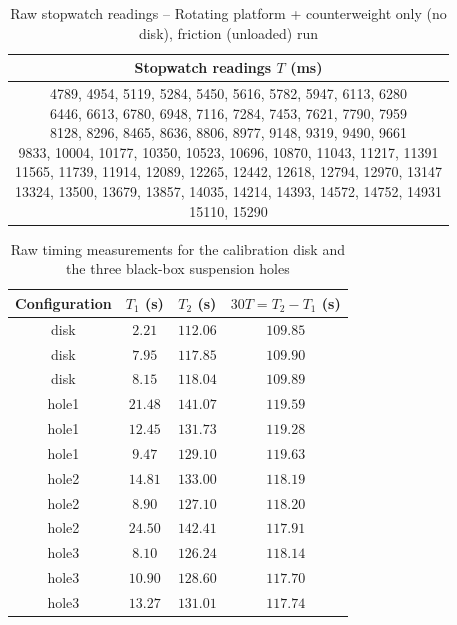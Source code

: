 \begin{table}[htb!]
\centering
\caption{Raw stopwatch readings -- Rotating platform + counterweight only (no disk), friction (unloaded) run}
\begin{tabular}{c}
\toprule
Stopwatch readings $T$ (\unit{\ms}) \\
\midrule
\makecell{4789, 4954, 5119, 5284, 5450, 5616, 5782, 5947, 6113, 6280 \\ 6446, 6613, 6780, 6948, 7116, 7284, 7453, 7621, 7790, 7959 \\ 8128, 8296, 8465, 8636, 8806, 8977, 9148, 9319, 9490, 9661 \\ 9833, 10004, 10177, 10350, 10523, 10696, 10870, 11043, 11217, 11391 \\ 11565, 11739, 11914, 12089, 12265, 12442, 12618, 12794, 12970, 13147 \\ 13324, 13500, 13679, 13857, 14035, 14214, 14393, 14572, 14752, 14931 \\ 15110, 15290} \\
\bottomrule
\end{tabular}
\end{table}
\begin{table}[htb!]
\centering
\caption{Raw timing measurements for the calibration disk and the three black-box suspension holes}
\begin{tabular}{cccc}
\toprule
Configuration & $T_1$ (\unit{\s}) & $T_2$ (\unit{\s}) & $30T=T_2-T_1$ (\unit{\s}) \\
\midrule
disk & $2.21$ & $112.06$ & $109.85$ \\
disk & $7.95$ & $117.85$ & $109.90$ \\
disk & $8.15$ & $118.04$ & $109.89$ \\
hole1 & $21.48$ & $141.07$ & $119.59$ \\
hole1 & $12.45$ & $131.73$ & $119.28$ \\
hole1 & $9.47$ & $129.10$ & $119.63$ \\
hole2 & $14.81$ & $133.00$ & $118.19$ \\
hole2 & $8.90$ & $127.10$ & $118.20$ \\
hole2 & $24.50$ & $142.41$ & $117.91$ \\
hole3 & $8.10$ & $126.24$ & $118.14$ \\
hole3 & $10.90$ & $128.60$ & $117.70$ \\
hole3 & $13.27$ & $131.01$ & $117.74$ \\
\bottomrule
\end{tabular}
\end{table}

